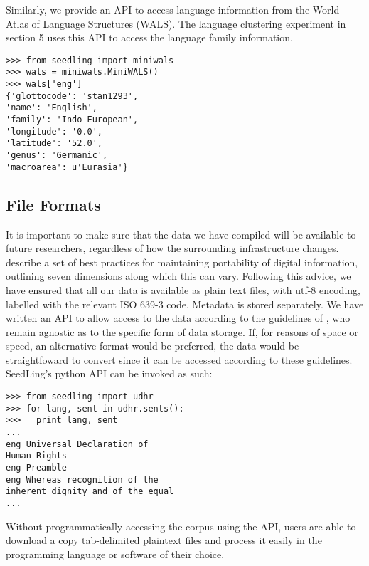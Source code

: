 Similarly, we provide an API to access language information from the World Atlas of Language Structures (WALS). The language clustering experiment in section 5 uses this API to access the language family information.

\small\begin{verbatim}
>>> from seedling import miniwals
>>> wals = miniwals.MiniWALS()
>>> wals['eng']
{'glottocode': 'stan1293', 
'name': 'English', 
'family': 'Indo-European', 
'longitude': '0.0', 
'latitude': '52.0', 
'genus': 'Germanic', 
'macroarea': u'Eurasia'}
\end{verbatim}
\normalsize

\subsection{File Formats}

It is important to make sure that the data we have compiled will be available to future researchers, regardless of how the surrounding infrastructure changes.  describe a set of best practices for maintaining portability of digital information, outlining seven dimensions along which this can vary. Following this advice, we have ensured that all our data is available as plain text files, with utf-8 encoding, labelled with the relevant ISO 639-3 code. Metadata is stored separately. We have written an API to allow access to the data according to the guidelines of , who remain agnostic as to the specific form of data storage. If, for reasons of space or speed, an alternative format would be preferred, the data would be straightfoward to convert since it can be accessed according to these guidelines. SeedLing's python API can be invoked as such:

\small\begin{verbatim}
>>> from seedling import udhr
>>> for lang, sent in udhr.sents():
>>>   print lang, sent
...
eng Universal Declaration of 
Human Rights
eng Preamble
eng Whereas recognition of the 
inherent dignity and of the equal 
...
\end{verbatim}
\normalsize

Without programmatically accessing the corpus using the API, users are able to download a copy tab-delimited plaintext files and process it easily in the programming language or software of their choice.